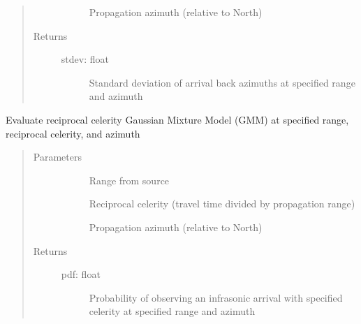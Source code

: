 \documentclass[letterpaper,10pt,english]{sphinxmanual}
\begin{document}
\begin{fulllineitems}
\begin{fulllineitems}
\begin{quote}
\begin{description}
\begin{description}
\item[{}] \leavevmode
Propagation azimuth (relative to North)

\end{description}

\item[{Returns}] \leavevmode\begin{description}
\item[{stdev: float}] \leavevmode
Standard deviation of arrival back azimuths at specified range and azimuth

\end{description}

\end{description}\end{quote}

\end{fulllineitems}


\begin{fulllineitems}
\label{\detokenize{stochprop.propagation:stochprop.propagation.PathGeometryModel.eval_rcel_gmm}}
Evaluate reciprocal celerity Gaussian Mixture Model (GMM)
at specified range, reciprocal celerity, and azimuth
\begin{quote}\begin{description}
\item[{Parameters}] \leavevmode\begin{description}
\item[{}] \leavevmode
Range from source

\item[{}] \leavevmode
Reciprocal celerity (travel time divided by propagation range)

\item[{}] \leavevmode
Propagation azimuth (relative to North)

\end{description}

\item[{Returns}] \leavevmode\begin{description}
\item[{pdf: float}] \leavevmode
Probability of observing an infrasonic arrival with specified celerity at specified range and azimuth


\end{description}
\end{description}
\end{quote}
\end{fulllineitems}
\end{fulllineitems}
\end{document}
